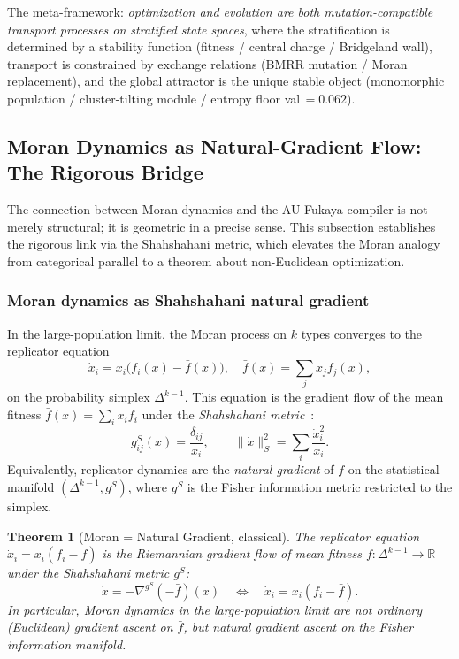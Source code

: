 \documentclass[11pt]{amsart}
\newtheorem{theorem}{Theorem}[section]
\begin{document}
The meta-framework: \emph{optimization and evolution are both
mutation-compatible transport processes on stratified state spaces},
where the stratification is determined by a stability function
(fitness / central charge / Bridgeland wall),
transport is constrained by exchange relations (BMRR mutation /
Moran replacement), and the global attractor is the unique stable
object (monomorphic population / cluster-tilting module /
entropy floor val\,$=0.062$).

\subsection{Moran Dynamics as Natural-Gradient Flow: The Rigorous Bridge}
\label{sec:moran_natural_gradient}

The connection between Moran dynamics and the AU-Fukaya compiler
is not merely structural; it is geometric in a precise sense.
This subsection establishes the rigorous link via the Shahshahani
metric, which elevates the Moran analogy from categorical parallel
to a theorem about non-Euclidean optimization.

\subsubsection*{Moran dynamics as Shahshahani natural gradient}

In the large-population limit, the Moran process on $k$ types
converges to the replicator equation
\[
  \dot{x}_i = x_i\bigl(f_i(x) - \bar{f}(x)\bigr),
  \quad \bar{f}(x) = \sum_j x_j f_j(x),
\]
on the probability simplex $\Delta^{k-1}$.
This equation is the gradient flow of the mean fitness
$\bar{f}(x) = \sum_i x_i f_i$ under the
\emph{Shahshahani metric}~\cite{Shahshahani1979}:
\[
  g_{ij}^S(x) = \frac{\delta_{ij}}{x_i},
  \qquad
  \|\dot{x}\|_S^2 = \sum_i \frac{\dot{x}_i^2}{x_i}.
\]
Equivalently, replicator dynamics are the \emph{natural gradient}
of $\bar{f}$ on the statistical manifold $(\Delta^{k-1}, g^S)$,
where $g^S$ is the Fisher information metric restricted to the simplex.

\begin{theorem}[Moran = Natural Gradient, classical]
\label{thm:moran_natural_grad}
The replicator equation $\dot{x}_i = x_i(f_i - \bar{f})$ is the
Riemannian gradient flow of mean fitness $\bar{f}: \Delta^{k-1} \to \mathbb{R}$
under the Shahshahani metric $g^S$:
\[
  \dot{x} = -\nabla^{g^S}(-\bar{f})(x)
  \quad \Longleftrightarrow \quad
  \dot{x}_i = x_i(f_i - \bar{f}).
\]
In particular, Moran dynamics in the large-population limit are
\emph{not} ordinary (Euclidean) gradient ascent on $\bar{f}$,
but natural gradient ascent on the Fisher information manifold.
\end{theorem}
\end{document}
